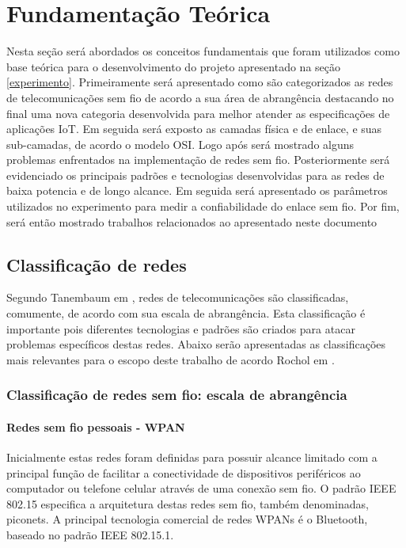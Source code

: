 \chapter{Fundamentação Teórica}
\label{fundamentacao}
Nesta seção será abordados os conceitos fundamentais que foram utilizados como base teórica para o desenvolvimento do projeto apresentado na seção \ref{experimento}.
Primeiramente será apresentado como são categorizados as redes de telecomunicações sem fio de acordo a sua área de abrangência destacando no final uma nova categoria desenvolvida para melhor atender as especificações de aplicações IoT.
Em seguida será exposto as camadas física e de enlace, e suas sub-camadas, de acordo o modelo OSI.
Logo após será mostrado alguns problemas enfrentados na implementação de redes sem fio.
Posteriormente será evidenciado os principais padrões e tecnologias desenvolvidas para as redes de baixa potencia e de longo alcance.
Em seguida será apresentado os parâmetros utilizados no experimento para medir a confiabilidade do enlace sem fio.
Por fim, será então mostrado trabalhos relacionados ao apresentado neste documento

\section{Classificação de redes}
\label{classRedes}
Segundo Tanembaum em \cite{tanembaum2011}, redes de telecomunicações são classificadas, comumente, de acordo com sua escala de abrangência. Esta classificação é importante pois diferentes tecnologias e padrões são criados para atacar problemas específicos destas redes. Abaixo serão apresentadas as classificações mais relevantes para o escopo deste trabalho de acordo Rochol em \cite{rochol2018sistemas}.


\subsection{Classificação de redes sem fio: escala de abrangência}
\subsubsection*{Redes sem fio pessoais - WPAN}
Inicialmente estas redes foram definidas para possuir alcance limitado com a principal função de facilitar a conectividade de dispositivos periféricos ao computador ou telefone celular através de uma conexão sem fio. O padrão IEEE 802.15 especifica a arquitetura destas redes sem fio, também denominadas, piconets. A principal  tecnologia comercial de redes WPANs é o Bluetooth, baseado no padrão IEEE 802.15.1.

